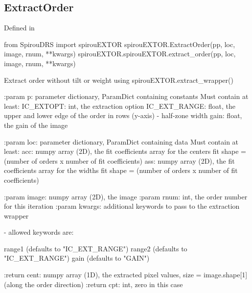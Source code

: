 \noindent\begin{minipage}{\textwidth}
\subsection{ExtractOrder}

Defined in \spirouEXTOR{}

\begin{pythonbox}
from SpirouDRS import spirouEXTOR
spirouEXTOR.ExtractOrder(pp, loc, image, rnum, **kwargs)
spirouEXTOR.spirouEXTOR.extract_order(pp, loc, image, rnum, **kwargs)
\end{pythonbox}

\begin{pythondocstring}
Extract order without tilt or weight using spirouEXTOR.extract_wrapper()

:param p: parameter dictionary, ParamDict containing constants
    Must contain at least:
            IC_EXTOPT: int, the extraction option
            IC_EXT_RANGE: float, the upper and lower edge of the order
                          in rows (y-axis) - half-zone width
            gain: float, the gain of the image

:param loc: parameter dictionary, ParamDict containing data
        Must contain at least:
            acc: numpy array (2D), the fit coefficients array for
                  the centers fit
                  shape = (number of orders x number of fit coefficients)
            ass: numpy array (2D), the fit coefficients array for
                  the widths fit
                  shape = (number of orders x number of fit coefficients)

:param image: numpy array (2D), the image
:param rnum: int, the order number for this iteration
:param kwargs: additional keywords to pass to the extraction wrapper

        - allowed keywords are:

        range1  (defaults to "IC_EXT_RANGE")
        range2  (defaults to "IC_EXT_RANGE")
        gain    (defaults to "GAIN")

:return cent: numpy array (1D), the extracted pixel values,
             size = image.shape[1] (along the order direction)
:return cpt: int, zero in this case
\end{pythondocstring}
\end{minipage}


